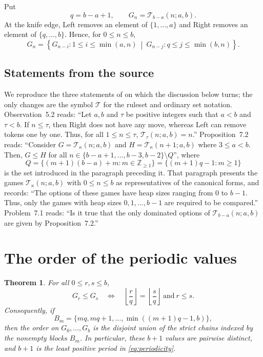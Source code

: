 \documentclass[11pt]{amsart}
\newtheorem{theorem}{Theorem}
\newcommand{\TS}{\mathcal{T}}
\begin{document}
Put
\[
q=b-a+1,\qquad G_n=\TS_{b-a}(n;a,b).
\]
At the knife edge, Left removes an element of $\{1,\dots,a\}$ and Right
removes an element of $\{q,\dots,b\}$. Hence, for $0\le n\le b$,
\begin{equation}\label{eq:recursion}
G_n=
\left\{
G_{n-i}:1\le i\le\min(a,n)
\ \middle|\
G_{n-j}:q\le j\le\min(b,n)
\right\}.
\end{equation}

\subsection*{Statements from the source}

We reproduce the three statements of \cite{DL} on which the discussion
below turns; the only changes are the symbol $\TS$ for the ruleset and
ordinary set notation. Observation~5.2 reads: ``Let $a,b$ and $\tau$ be
positive integers such that $a<b$ and $\tau<b$. If $n\le\tau$, then
Right does not have any move, whereas Left can remove tokens one by
one. Thus, for all $1\le n\le\tau$, $\TS_\tau(n;a,b)=n$.''
Proposition~7.2 reads: ``Consider $G=\TS_\kappa(n;a,b)$ and
$H=\TS_\kappa(n+1;a,b)$ where $3\le a<b$. Then, $G\le H$ for all
$n\in\{b-a+1,\dots,b-3,b-2\}\setminus Q$'', where
\[
Q=\{(m+1)(b-a)+m:m\in\mathbb{Z}_{\ge1}\}=\{(m+1)q-1:m\ge1\}
\]
is the set introduced in the paragraph preceding it. That paragraph
presents the games $\TS_\kappa(n;a,b)$ with $0\le n\le b$ as
representatives of the canonical forms, and records: ``The options of
these games have heap sizes ranging from $0$ to $b-1$. Thus, only the
games with heap sizes $0,1,\dots,b-1$ are required to be compared.''
Problem~7.1 reads:
``Is it true that the only dominated options of $\TS_{b-a}(n;a,b)$ are
given by Proposition~7.2.''

\section{The order of the periodic values}

\begin{theorem}\label{thm:order}
For all $0\le r,s\le b$,
\begin{equation}\label{eq:order}
G_r\le G_s
\quad\Longleftrightarrow\quad
\left\lfloor\frac rq\right\rfloor=
\left\lfloor\frac sq\right\rfloor
\ \text{and}\ r\le s.
\end{equation}
Consequently, if
\[
B_m=\{mq,mq+1,\dots,\min((m+1)q-1,b)\},
\]
then the order on $G_0,\dots,G_b$ is the disjoint union of the strict
chains indexed by the nonempty blocks $B_m$. In particular, these
$b+1$ values are pairwise distinct, and $b+1$ is the least positive
period in \eqref{eq:periodicity}.
\end{theorem}
\end{document}
